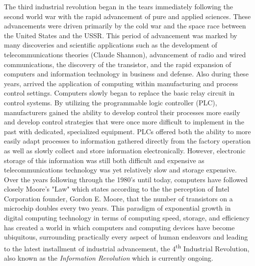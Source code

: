 The third industrial revolution began in the tears immediately following the second world war with the rapid advancement of pure and applied sciences.  These advancements were driven primarily by the cold war and the space race between the United States and the USSR.  This period of advancement was marked by many discoveries and scientific applications such as the development of telecommunications theories (Claude Shannon), advancement of radio and wired communications, the discovery of the transistor, and the rapid expansion of computers and information technology in business and defense.  Also during these years, arrived the application of computing within manufacturing and process control settings. Computers slowly began to replace the basic relay circuit in control systems.  By utilizing the programmable logic controller (PLC), manufacturers gained the ability to develop control their processes more easily and develop control strategies that were once more difficult to implement in the past with dedicated, specialized equipment.  PLCs offered both the ability to more easily adapt processes to information gathered directly from the factory operation as well as slowly collect and store information electronically.  However, electronic storage of this information was still both difficult and expensive as telecommunications technology was yet relatively slow and storage expensive.  Over the years following through the 1980's until today, computers have followed closely Moore's "Law" which states according to the the perception of Intel Corporation founder, Gordon E. Moore, that the number of transistors on a microchip doubles every two years.  This paradigm of exponential growth in digital computing technology in terms of computing speed, storage, and efficiency has created a world in which computers and computing devices have become ubiquitous, surrounding practically every aspect of human endeavors and leading to the latest installment of industrial advancement, the 4\textsuperscript{th} Industrial Revolution, also known as the \textit{Information Revolution} which is currently ongoing. 

